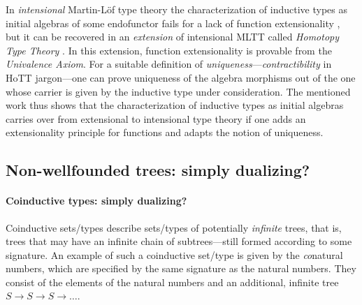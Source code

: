 \documentclass[a4paper,USenglish]{lipics}
\begin{document}
 
  In \emph{intensional} Martin-Löf type theory the characterization of inductive types as initial algebras of some endofunctor fails 
  for a lack of function extensionality \parencite{DBLP:journals/tcs/Dybjer97}, 
  but it can be recovered \parencite{DBLP:conf/lics/AwodeyGS12} in an \emph{extension} of intensional MLTT called
  \emph{Homotopy Type Theory} \parencite{hottbook}.
  In this extension, function extensionality is provable from the \emph{Univalence Axiom}. 
 For a suitable definition of \emph{uniqueness}---\emph{contractibility} in HoTT jargon---one can prove uniqueness of the
 algebra morphisms out of the one whose carrier is given by the inductive type under consideration.
 The mentioned work \parencite{DBLP:conf/lics/AwodeyGS12} thus shows that the characterization of inductive types as initial algebras carries over 
 from extensional to intensional type theory if one adds an extensionality principle for functions and adapts the notion of uniqueness.
 
 
\begin{comment} 
 The characterization of inductive sets/types as initial objects in some category
 has been extended to some \emph{heterogeneous}---also called \emph{nested}---inductive data types, e.g., the type of $\lambda$-terms,
 in different formulations \parencite{fpt, DBLP:journals/iandc/HirschowitzM10}.
 The main goal of these works is not just to characterize a data type via a universal property, but rather a data type
 \emph{equipped with a canonical, well-behaved substitution operation}.
\end{comment} 
 
\begin{Long}
 \subsection{Non-wellfounded trees: simply dualizing?}\label{sec:sem_coind}
\end{Long}
\begin{Short}
 \paragraph*{Coinductive types: simply dualizing?}
\end{Short}

  Coinductive sets/types describe sets/types of potentially \emph{infinite} trees, that is, trees that may have an infinite chain of subtrees---still formed according to some signature.
  An example of such a coinductive set/type is given by the \emph{co}natural numbers, which are specified by the same signature as the natural numbers.
  They consist of the elements of the natural numbers and an additional,
  infinite tree $S \longrightarrow S\longrightarrow S \longrightarrow \ldots$. 
  
\end{document}
